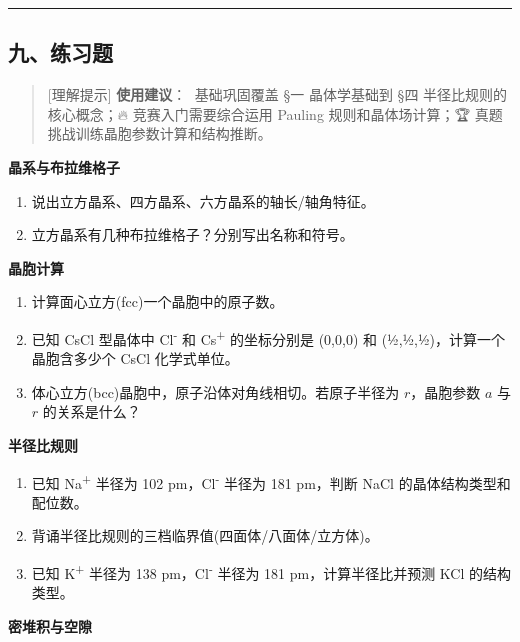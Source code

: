 \begin{center}\rule{0.5\linewidth}{0.5pt}\end{center}

\subsection{九、练习题}\label{ux4e5dux7ec3ux4e60ux9898}

\begin{quote}
{[}理解提示{]} \textbf{使用建议}：🌱 基础巩固覆盖 §一 晶体学基础到 §四 半径比规则的核心概念；🔥 竞赛入门需要综合运用 Pauling 规则和晶体场计算；🏆 真题挑战训练晶胞参数计算和结构推断。
\end{quote}

\textbf{晶系与布拉维格子}

\begin{enumerate}
\def\labelenumi{\arabic{enumi}.}
\item
  说出立方晶系、四方晶系、六方晶系的轴长/轴角特征。
\item
  立方晶系有几种布拉维格子？分别写出名称和符号。
\end{enumerate}

\textbf{晶胞计算}

\begin{enumerate}
\def\labelenumi{\arabic{enumi}.}
\setcounter{enumi}{2}
\item
  计算面心立方(fcc)一个晶胞中的原子数。
\item
  已知 CsCl 型晶体中 Cl\textsuperscript{-} 和 Cs\textsuperscript{+} 的坐标分别是 (0,0,0) 和 (½,½,½)，计算一个晶胞含多少个 CsCl 化学式单位。
\item
  体心立方(bcc)晶胞中，原子沿体对角线相切。若原子半径为 \(r\)，晶胞参数 \(a\) 与 \(r\) 的关系是什么？
\end{enumerate}

\textbf{半径比规则}

\begin{enumerate}
\def\labelenumi{\arabic{enumi}.}
\setcounter{enumi}{5}
\item
  已知 Na\textsuperscript{+} 半径为 102 pm，Cl\textsuperscript{-} 半径为 181 pm，判断 NaCl 的晶体结构类型和配位数。
\item
  背诵半径比规则的三档临界值(四面体/八面体/立方体)。
\item
  已知 K\textsuperscript{+} 半径为 138 pm，Cl\textsuperscript{-} 半径为 181 pm，计算半径比并预测 KCl 的结构类型。
\end{enumerate}

\textbf{密堆积与空隙}

